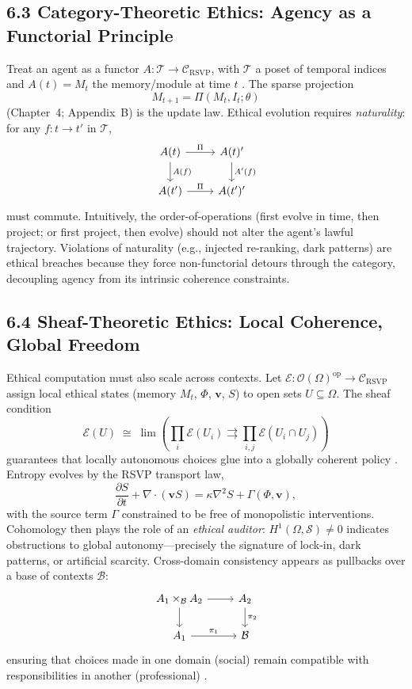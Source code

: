 \documentclass[12pt]{article}
\begin{document}
\subsection*{6.3 Category-Theoretic Ethics: Agency as a Functorial Principle}
Treat an agent as a functor \(A:\mathcal{T}\to\mathcal{C}_{\text{RSVP}}\), with \(\mathcal{T}\) a poset
of temporal indices and \(A(t)=M_t\) the memory/module at time \(t\)
\citep{lawvere2009, maclane1998}. The sparse projection
\[
M_{t+1}=\Pi(M_t, I_t;\theta)
\]
(Chapter~4; Appendix~B) is the update law. Ethical evolution requires \emph{naturality}:
for any \(f:t\to t'\) in \(\mathcal{T}\),
\[
\begin{tikzcd}
A(t) \arrow[r, "\Pi"] \arrow[d, "A(f)"] & A(t)'\arrow[d, "A'(f)"] \\
A(t') \arrow[r, "\Pi"] & A(t')'
\end{tikzcd}
\]
must commute. Intuitively, the order-of-operations (first evolve in time, then project;
or first project, then evolve) should not alter the agent’s lawful trajectory. Violations
of naturality (e.g., injected re-ranking, dark patterns) are ethical breaches because they
force non-functorial detours through the category, decoupling agency from its intrinsic
coherence constraints.

\subsection*{6.4 Sheaf-Theoretic Ethics: Local Coherence, Global Freedom}
Ethical computation must also scale across contexts. Let
\(\mathcal{E}:\mathcal{O}(\Omega)^{\mathrm{op}}\!\to\!\mathcal{C}_{\text{RSVP}}\) assign local ethical states (memory
\(M_t\), \(\Phi\), \(\mathbf{v}\), \(S\)) to open sets \(U\subseteq\Omega\). The sheaf condition
\[
\mathcal{E}(U) \;\cong\; \lim\!\left( \prod_i \mathcal{E}(U_i)
\rightrightarrows \prod_{i,j}\mathcal{E}(U_i\!\cap\!U_j) \right)
\]
guarantees that locally autonomous choices glue into a globally coherent policy
\citep{maclane1998, hatcher2002}. Entropy evolves by the RSVP transport law,
\[
\frac{\partial S}{\partial t} + \nabla\!\cdot(\mathbf{v}S)
= \kappa \nabla^2 S + \Gamma(\Phi,\mathbf{v}),
\]
with the source term \(\Gamma\) constrained to be free of monopolistic interventions. Cohomology
then plays the role of an \emph{ethical auditor}: \(H^1(\Omega,\mathcal{S})\neq 0\) indicates
obstructions to global autonomy—precisely the signature of lock-in, dark patterns, or
artificial scarcity. Cross-domain consistency appears as pullbacks over a base of contexts
\(\mathcal{B}\):
\[
\begin{tikzcd}
A_1 \times_{\mathcal{B}} A_2 \arrow[r] \arrow[d] & A_2 \arrow[d, "\pi_2"] \\
A_1 \arrow[r, "\pi_1"] & \mathcal{B}
\end{tikzcd}
\]
ensuring that choices made in one domain (social) remain compatible with responsibilities
in another (professional) \citep{deleuze1987}.
\end{document}
